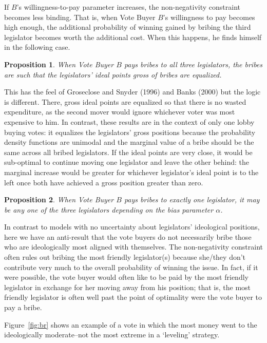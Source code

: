 \documentclass[12pt]{article}
\newtheorem{proposition}{Proposition}
\newcommand{\al}{\alpha}
\begin{document}
If $B$'s willingness-to-pay parameter increases, the non-negativity constraint becomes less binding. That is, when Vote Buyer $B$'s willingness to pay becomes high enough, the additional probability of winning gained by bribing the third legislator becomes worth the additional cost. When this happens, he finds himself in the following case.

\begin{proposition}
  When Vote Buyer $B$ pays bribes to all three legislators, the bribes are such that the legislators' ideal points gross of bribes are equalized.
	\label{prop:3NNB}
\end{proposition}

This has the feel of Groseclose and Snyder (1996) and Banks (2000) but the logic is different. There, gross ideal points are equalized so that there is no wasted expenditure, as the second mover would ignore whichever voter was most expensive to him. In contrast, these results are in the context of only one lobby buying votes: it equalizes the legislators' gross positions because the probability density functions are unimodal and the marginal value of a bribe should be the same across all bribed legislators. If the ideal points are very close, it would be sub-optimal to continue moving one legislator and leave the other behind: the marginal increase would be greater for whichever legislator's ideal point is to the left once both have achieved a gross position greater than zero.


\begin{proposition}
  When Vote Buyer $B$ pays bribes to exactly one legislator, it may be any one of the three legislators depending on the bias parameter $\al$.
	\label{prop:1NNB}
\end{proposition}
In contrast to models with no uncertainty about legislators' ideological positions, here we have an anti-result that the vote buyers do not necessarily bribe those who are ideologically most aligned with themselves. The non-negativity constraint often rules out bribing the most friendly legislator(s) because she/they don't contribute very much to the overall probability of winning the issue. In fact, if it were possible, the vote buyer would often like to be paid by the most friendly legislator in exchange for her moving away from his position; that is, the most friendly legislator is often well past the point of optimality were the vote buyer to pay a bribe.

Figure~\ref{fig:br} shows an example of a vote in which the most money went to the ideologically moderate--not the most extreme in a `leveling' strategy.
\end{document}
